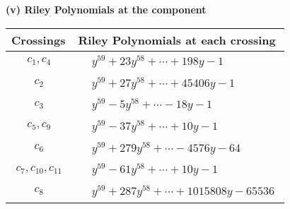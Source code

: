 \documentclass[1p]{elsarticle_modified}
\theoremstyle{definition}
\begin{document}
\flushleft \textbf{(v) Riley Polynomials at the component}\newline \\
\begin{tabular}{m{50pt}|m{274pt}}
Crossings & \hspace{64pt}Riley Polynomials at each crossing \\
\hline $$\begin{aligned}c_{1},c_{4}\end{aligned}$$&$\begin{aligned}
&y^{59}+23 y^{58}+\cdots+198 y-1
\end{aligned}$\\
\hline $$\begin{aligned}c_{2}\end{aligned}$$&$\begin{aligned}
&y^{59}+27 y^{58}+\cdots+45406 y-1
\end{aligned}$\\
\hline $$\begin{aligned}c_{3}\end{aligned}$$&$\begin{aligned}
&y^{59}-5 y^{58}+\cdots-18 y-1
\end{aligned}$\\
\hline $$\begin{aligned}c_{5},c_{9}\end{aligned}$$&$\begin{aligned}
&y^{59}-37 y^{58}+\cdots+10 y-1
\end{aligned}$\\
\hline $$\begin{aligned}c_{6}\end{aligned}$$&$\begin{aligned}
&y^{59}+279 y^{58}+\cdots-4576 y-64
\end{aligned}$\\
\hline $$\begin{aligned}c_{7},c_{10},c_{11}\end{aligned}$$&$\begin{aligned}
&y^{59}-61 y^{58}+\cdots+10 y-1
\end{aligned}$\\
\hline $$\begin{aligned}c_{8}\end{aligned}$$&$\begin{aligned}
&y^{59}+287 y^{58}+\cdots+1015808 y-65536
\end{aligned}$\\
\hline
\end{tabular}\\~\\
\end{document}
